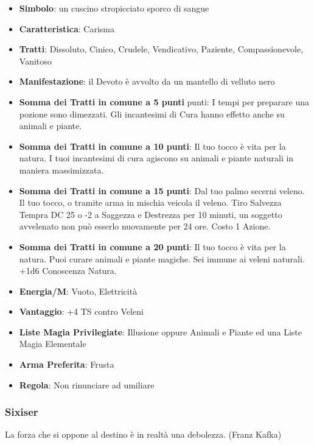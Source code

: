\begin{multicols}{2}
\begin{itemize}[leftmargin=*] \setlength{\itemsep}{0pt}
\item \textbf{Simbolo}: un cuscino stropicciato sporco di sangue
\item \textbf{Caratteristica}: Carisma
\item \textbf{Tratti}: Dissoluto, Cinico, Crudele, Vendicativo, Paziente, Compassionevole, Vanitoso
\item \textbf{Manifestazione}: il Devoto è avvolto da un mantello di velluto nero
\item \textbf{Somma dei Tratti in comune a 5 punti} punti: I tempi per preparare una pozione sono dimezzati. Gli incantesimi di Cura hanno effetto anche su animali e piante.
\item \textbf{Somma dei Tratti in comune a 10 punti}: Il tuo tocco è vita per la natura. I tuoi incantesimi di cura agiscono su animali e piante naturali in maniera massimizzata.
\item \textbf{Somma dei Tratti in comune a 15 punti}: Dal tuo palmo secerni veleno. Il tuo tocco, o tramite arma in mischia veicola il veleno. Tiro Salvezza Tempra DC 25 o -2 a Saggezza e Destrezza per 10 minuti, un soggetto avvelenato non può esserlo nuovamente per 24 ore. Costo 1 Azione.
\item \textbf{Somma dei Tratti in comune a 20 punti}: Il tuo tocco è vita per la natura. Puoi curare animali e piante magiche. Sei immune ai veleni naturali. +1d6 Conoscenza Natura.
\item \textbf{Energia/M}: Vuoto, Elettricità
\item \textbf{Vantaggio}: +4 TS contro Veleni
\item \textbf{Liste Magia Privilegiate}: Illusione oppure Animali e Piante ed una Liste Magia Elementale
\item \textbf{Arma Preferita}: Frusta
\item \textbf{Regola}: Non rinunciare ad umiliare
\end{itemize}

\subsubsection{Sixiser}\label{sixiser}\hypertarget{sixiser}{}

\begin{enfasi}{
La forza che si oppone al destino è in realtà una debolezza. (Franz Kafka)

\medskip

}
\end{enfasi}
\end{multicols}
